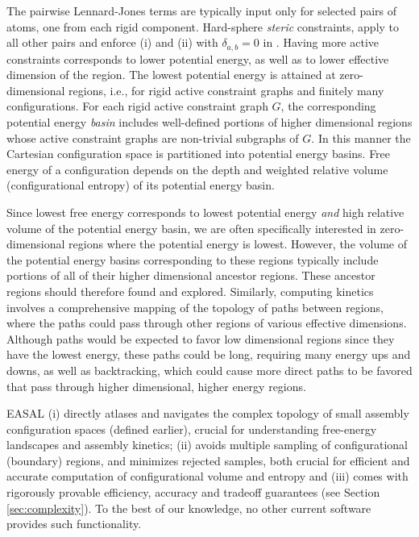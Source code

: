 The pairwise Lennard-Jones terms are typically input only for selected pairs of
atoms, one from each rigid component. Hard-sphere \emph{steric} constraints,
apply to all other pairs and enforce (i) and (ii) with $\delta_{a,b} = 0$ in
\ctwo.  Having more active constraints corresponds to lower potential energy,
as well as to lower effective dimension of the region. The lowest potential
energy is attained at zero-dimensional regions, i.e., for rigid active constraint
graphs and finitely many configurations. For each rigid active constraint graph
$G$, the corresponding potential energy \emph{basin} includes well-defined
portions of higher dimensional regions whose active constraint graphs are
non-trivial subgraphs of $G$. In this manner the Cartesian configuration space
is partitioned into potential energy basins. Free energy of a configuration
depends on the depth and weighted relative volume (configurational entropy) of
its potential energy basin.

Since lowest free energy corresponds to lowest potential energy \emph{and} high
relative volume of the potential energy basin, we are often specifically
interested in zero-dimensional regions where the potential energy is lowest.
However, the volume of the potential energy basins corresponding to these
regions typically include portions of all of their higher dimensional ancestor
regions. These ancestor regions should therefore found and explored. Similarly,
computing kinetics involves a comprehensive mapping of the topology of paths
between regions, where the paths could pass through other regions of various
effective dimensions. Although paths would be expected to favor low dimensional
regions since they have the lowest energy, these paths could be long, requiring
many energy ups and downs, as well as backtracking, which could cause more
direct paths to be favored that pass through higher dimensional, higher energy
regions. 


EASAL (i) directly atlases and navigates the complex topology of small assembly
configuration spaces (defined earlier), crucial for understanding free-energy
landscapes and assembly kinetics; (ii) avoids multiple sampling of
configurational (boundary) regions, and minimizes rejected samples, both
crucial for efficient and accurate computation of configurational volume and
entropy and (iii) comes with rigorously provable efficiency, accuracy and
tradeoff guarantees (see Section \ref{sec:complexity}). To the best of our
knowledge, no other current software provides such functionality.


